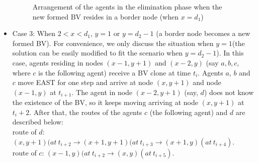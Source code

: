 \begin{itemize}
\begin{figure} [H]
    \caption{Arrangement of the agents in the elimination phase when the new formed BV resides in a border node (when $x=d_1$)} 
  \label{fig:casetwo} %
\end{figure}

\item Case 3: When $2<x<d_1$, $y=1$ or $y=d_2-1$ (a border node becomes a new formed BV). For convenience, we only discuss the situation when $y=1$(the solution can be easily modified to fit the scenario when $y=d_2-1$). In this case, agents residing in nodes $(x-1, y+1)$ and $(x-2, y)$ (say  $a,b,c$, where $c$ is the following agent) receive a BV clone at time $t_i$. Agents $a$, $b$ and $c$ move EAST for one step and arrive at node $(x, y+1)$ and node $(x-1, y)$ at $t_{i+1}$. The agent in node $(x-2, y+1)$ (say, $d$) does not know the existence of the BV, so it keeps moving arriving at node $(x, y+1)$ at $t_i+2$. After that, the routes of the agents $c$ (the following agent) and $d$ are described  below:\\
route of $d$: $(x, y+1)(at\ t_{i+2}{\rightarrow}(x+1,y+1)(at\ t_{i+3}{\rightarrow}(x+1,y)(at\ t_{i+4})$.\\
route of $c$: $(x-1, y)(at\ t_{i+2}{\rightarrow}(x, y)(at\ t_{i+5})$.



\end{itemize}
